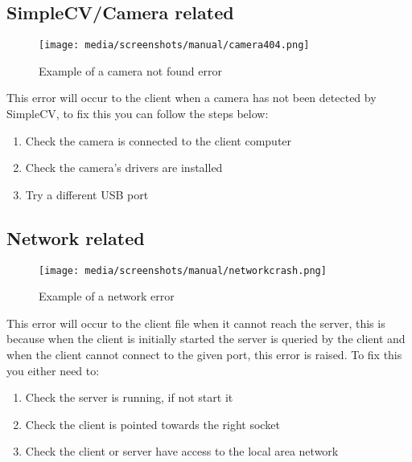 \documentclass[12pt,a4paper]{report}
\begin{document}
    \subsection{SimpleCV/Camera related}
        \begin{figure}[H]
            \centering
            \caption{Example of a camera not found error}
            \label{fig:camera404}
                \texttt{[image: media/screenshots/manual/camera404.png]}
        \end{figure} 
        This error will occur to the client when a camera has not been detected by SimpleCV, to fix this you can follow the steps below:
        \begin{enumerate}
            \item Check the camera is connected to the client computer
            \item Check the camera's drivers are installed
            \item Try a different USB port
        \end{enumerate}



    \subsection{Network related}
        \begin{figure}[H]
            \centering
            \caption{Example of a network error}
            \label{fig:networkcrash}
                \texttt{[image: media/screenshots/manual/networkcrash.png]}
        \end{figure} 
        This error will occur to the client file when it cannot reach the server, this is because when the client is initially started the 
        server is queried by the client and when the client cannot connect to the given port, this error is raised. To fix this you either
        need to:
        \begin{enumerate}
            \item Check the server is running, if not start it
            \item Check the client is pointed towards the right socket
            \item Check the client or server have access to the local area network
        \end{enumerate}
\end{document}
